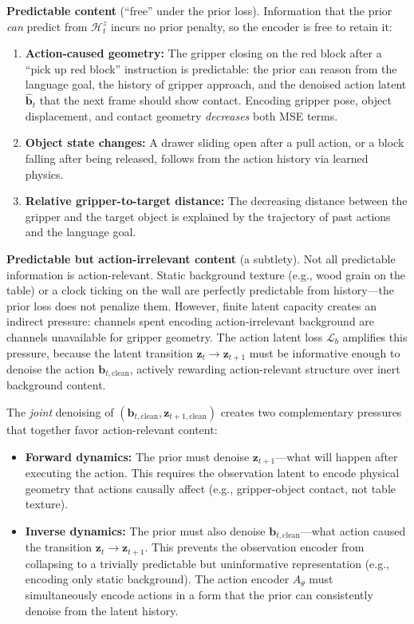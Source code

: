 \documentclass{article}
\newcommand{\vz}{\bm{z}}
\newcommand{\vb}{\bm{b}}
\newcommand{\loss}{\mathcal{L}}
\begin{document}
\textbf{Predictable content} (``free'' under the prior loss). Information that the prior \emph{can} predict from $\mathcal{H}_t^z$ incurs no prior penalty, so the encoder is free to retain it:
\begin{enumerate}[leftmargin=*]
  \item \textbf{Action-caused geometry:} The gripper closing on the red block after a ``pick up red block'' instruction is predictable: the prior can reason from the language goal, the history of gripper approach, and the denoised action latent $\hat{\vb}_t$ that the next frame should show contact. Encoding gripper pose, object displacement, and contact geometry \emph{decreases} both MSE terms.

  \item \textbf{Object state changes:} A drawer sliding open after a pull action, or a block falling after being released, follows from the action history via learned physics.

  \item \textbf{Relative gripper-to-target distance:} The decreasing distance between the gripper and the target object is explained by the trajectory of past actions and the language goal.
\end{enumerate}

\textbf{Predictable but action-irrelevant content} (a subtlety). Not all predictable information is action-relevant. Static background texture (e.g., wood grain on the table) or a clock ticking on the wall are perfectly predictable from history---the prior loss does not penalize them. However, finite latent capacity creates an indirect pressure: channels spent encoding action-irrelevant background are channels unavailable for gripper geometry. The action latent loss $\loss_b$ amplifies this pressure, because the latent transition $\vz_t \to \vz_{t+1}$ must be informative enough to denoise the action $\vb_{t,\text{clean}}$, actively rewarding action-relevant structure over inert background content.

\medskip

The \emph{joint} denoising of $(\vb_{t,\text{clean}}, \vz_{t+1,\text{clean}})$ creates two complementary pressures that together favor action-relevant content:
\begin{itemize}[leftmargin=*,itemsep=2pt]
  \item \textbf{Forward dynamics:} The prior must denoise $\vz_{t+1}$---what will happen after executing the action. This requires the observation latent to encode physical geometry that actions causally affect (e.g., gripper-object contact, not table texture).
  \item \textbf{Inverse dynamics:} The prior must also denoise $\vb_{t,\text{clean}}$---what action caused the transition $\vz_t \to \vz_{t+1}$. This prevents the observation encoder from collapsing to a trivially predictable but uninformative representation (e.g., encoding only static background). The action encoder $A_\theta$ must simultaneously encode actions in a form that the prior can consistently denoise from the latent history.
\end{itemize}
\end{document}

